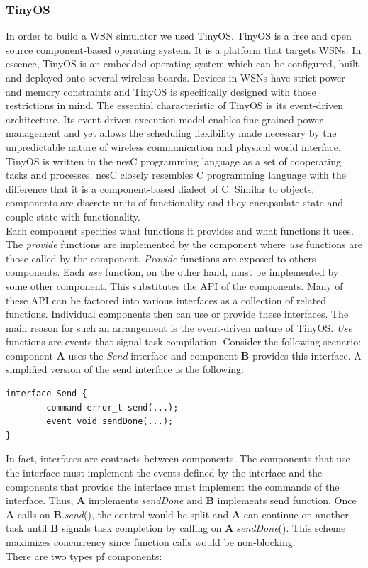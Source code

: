 \documentclass[11pt, titlepage, oneside]{article}
\begin{document}
\subsubsection{TinyOS} 
In order to build a WSN simulator we used TinyOS. TinyOS is a free and open source component-based operating system. It is a platform that targets WSNs. In essence, TinyOS is an embedded operating system which can be configured, built and deployed onto several wireless boards. Devices in WSNs have strict power and memory constraints and TinyOS is specifically designed with those restrictions in mind. The essential characteristic of TinyOS is its event-driven architecture. Its event-driven execution model enables fine-grained power management and yet allows the scheduling flexibility made necessary by the unpredictable nature of wireless communication and physical world interface.  \\
TinyOS is written in the nesC programming language as a set of cooperating tasks and processes. nesC closely resembles C programming language with the difference that it is a component-based dialect of C. Similar to objects, components are discrete units of functionality and they encapsulate state and couple state with functionality\cite{tinyos}.  \\
Each component specifies what functions it provides and what functions it uses. The {\it  provide} functions are implemented by the component where {\it use} functions are those called by the component. {\it  Provide} functions are exposed to others components. Each {\it use} function, on the other hand, must be implemented by some other component. This substitutes the API of the components. Many of these API can be factored into various interfaces as a collection of related functions. Individual components then can use or provide these interfaces. The main reason for such an arrangement is the event-driven nature of TinyOS. {\it  Use} functions are events that signal task compilation. Consider the following scenario: component {\bf A} uses the {\it Send} interface and component {\bf B} provides this interface. A simplified version of the send interface is the following: 
 
\begin{lstlisting}[label=some-code,caption=Send Interface] 
interface Send { 
        command error_t send(...); 
        event void sendDone(...); 
} 
\end{lstlisting} 
 
In fact, interfaces are contracts between components. The components that use the interface must implement the events defined by the interface and the components that provide the interface must implement the commands of the interface. Thus, {\bf A} implements {\it sendDone} and {\bf B} implements send function. Once {\bf A} calls on {\bf B}.{\it send}(), the control would be split and {\bf A} can continue on another task until {\bf B} signals task completion by calling on {\bf A}.{\it sendDone}(). This scheme maximizes concurrency since function calls would be non-blocking. \\
There are two types pf components: 
 
\end{document}
